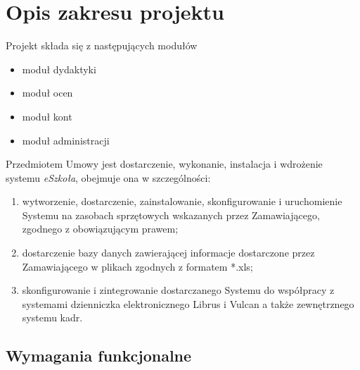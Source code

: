 \documentclass{article}
\begin{document}
\newpage
\section{Opis zakresu projektu}


Projekt składa się z następujących modułów
\begin{itemize}
    \item moduł dydaktyki
    \item moduł ocen
    \item moduł kont
    \item moduł administracji
\end{itemize}

Przedmiotem Umowy jest dostarczenie, wykonanie, instalacja i wdrożenie systemu \textit{eSzkoła}, obejmuje ona w szczególności:
\begin{enumerate}
    \item wytworzenie, dostarczenie, zainstalowanie, skonfigurowanie i uruchomienie Systemu na zasobach sprzętowych wskazanych przez Zamawiającego, zgodnego z obowiązującym prawem;
    \item dostarczenie bazy danych zawierającej informacje dostarczone przez Zamawiającego w plikach zgodnych z formatem *.xls;
    \item skonfigurowanie i zintegrowanie dostarczanego Systemu do współpracy z systemami dzienniczka elektronicznego Librus i Vulcan a także zewnętrznego systemu kadr.
\end{enumerate}

\subsection{Wymagania funkcjonalne}
\end{document}
